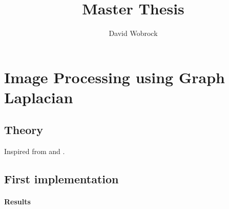 \documentclass[]{article}
\title{Master Thesis}
\author{David Wobrock}
\begin{document}
\maketitle

\section{Image Processing using Graph Laplacian}

\subsection{Theory}

Inspired from \cite{siam_slides_2016} and \cite{talebi_global_2014}.

\subsection{First implementation}

\paragraph{Results}

\clearpage
\printbibliography
\end{document}
